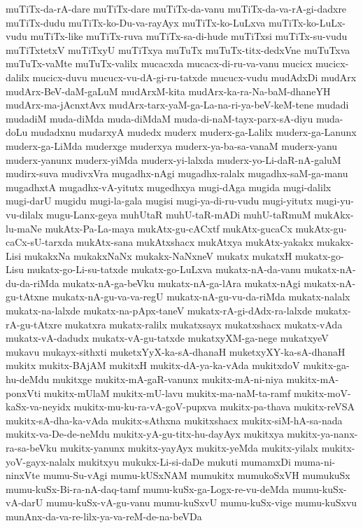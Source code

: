 {muTiTx-da-rA-dare
muTiTx-dare
muTiTx-da-vanu
muTiTx-da-va-rA-gi-dadxre
muTiTx-dudu
muTiTx-ko-Du-va-rayAyx
muTiTx-ko-LuLxva
muTiTx-ko-LuLx-vudu
muTiTx-like
muTiTx-ruva
muTiTx-sa-di-hude
muTiTxsi
muTiTx-su-vudu
muTiTxtetxV
muTiTxyU
muTiTxya
muTuTx
muTuTx-titx-dedxVne
muTuTxva
muTuTx-vaMte
muTuTx-valilx
mucacxda
mucacx-di-ru-va-vanu
mucicx
mucicx-dalilx
mucicx-duvu
mucucx-vu-dA-gi-ru-tatxde
mucucx-vudu
mudAdxDi
mudArx
mudArx-BeV-daM-gaLuM
mudArxM-kita
mudArx-ka-ra-Na-baM-dhaneYH
mudArx-ma-jAcnxtAvx
mudArx-tarx-yaM-ga-La-na-ri-ya-beV-keM-tene
mudadi
mudadiM
muda-diMda
muda-diMdaM
muda-di-naM-tayx-parx-sA-diyu
muda-doLu
mudadxnu
mudarxyA
mudedx
muderx
muderx-ga-Lalilx
muderx-ga-Lanunx
muderx-ga-LiMda
muderxge
muderxya
muderx-ya-ba-sa-vanaM
muderx-yanu
muderx-yanunx
muderx-yiMda
muderx-yi-lalxda
muderx-yo-Li-daR-nA-galuM
mudirx-suva
mudivxVra
mugadhx-nAgi
mugadhx-ralalx
mugadhx-saM-ga-manu
mugadhxtA
mugadhx-vA-yitutx
mugedhxya
mugi-dAga
mugida
mugi-dalilx
mugi-darU
mugidu
mugi-la-gala
mugisi
mugi-ya-di-ru-vudu
mugi-yitutx
mugi-yu-vu-dilalx
mugu-Lanx-geya
muhUtaR
muhU-taR-mADi
muhU-taRmuM
mukAkx-lu-maNe
mukAtx-Pa-La-maya
mukAtx-gu-cACxtf
mukAtx-gucaCx
mukAtx-gu-caCx-sU-tarxda
mukAtx-sana
mukAtxshacx
mukAtxya
mukAtx-yakakx
mukakx-Lisi
mukakxNa
mukakxNaNx
mukakx-NaNxneV
mukatx
mukatxH
mukatx-go-Lisu
mukatx-go-Li-su-tatxde
mukatx-go-LuLxva
mukatx-nA-da-vanu
mukatx-nA-du-da-riMda
mukatx-nA-ga-beVku
mukatx-nA-ga-lAra
mukatx-nAgi
mukatx-nA-gu-tAtxne
mukatx-nA-gu-va-va-regU
mukatx-nA-gu-vu-da-riMda
mukatx-nalalx
mukatx-na-lalxde
mukatx-na-pApx-taneV
mukatx-rA-gi-dAdx-ra-lalxde
mukatx-rA-gu-tAtxre
mukatxra
mukatx-ralilx
mukatxsayx
mukatxshacx
mukatx-vAda
mukatx-vA-dadudx
mukatx-vA-gu-tatxde
mukatxyXM-ga-nege
mukatxyeV
mukavu
mukayx-sithxti
muketxYyX-ka-sA-dhanaH
muketxyXY-ka-sA-dhanaH
mukitx
mukitx-BAjAM
mukitxH
mukitx-dA-ya-ka-vAda
mukitxdoV
mukitx-ga-hu-deMdu
mukitxge
mukitx-mA-gaR-vanunx
mukitx-mA-ni-niya
mukitx-mA-ponxVti
mukitx-mUlaM
mukitx-mU-lavu
mukitx-ma-naM-ta-ramf
mukitx-moV-kaSx-va-neyidx
mukitx-mu-ku-ra-vA-goV-pupxva
mukitx-pa-thava
mukitx-reVSA
mukitx-sA-dha-ka-vAda
mukitx-sAthxna
mukitxshacx
mukitx-siM-hA-sa-nada
mukitx-va-De-de-neMdu
mukitx-yA-gu-titx-hu-dayAyx
mukitxya
mukitx-ya-nanx-ra-sa-beVku
mukitx-yanunx
mukitx-yayAyx
mukitx-yeMda
mukitx-yilalx
mukitx-yoV-gayx-nalalx
mukitxyu
mukukx-Li-si-daDe
mukuti
mumamxDi
muma-ni-ninxVte
mumu-Su-vAgi
mumu-kUSxNAM
mumukitx
mumukoSxVH
mumukuSx
mumu-kuSx-Bi-ra-nA-daq-tamf
mumu-kuSx-ga-Logx-re-vu-deMda
mumu-kuSx-vA-darU
mumu-kuSx-vA-gu-vanu
mumu-kuSxvU
mumu-kuSx-vige
mumu-kuSxvu
munAnx-da-va-re-lilx-ya-va-reM-de-na-beVDa
}
